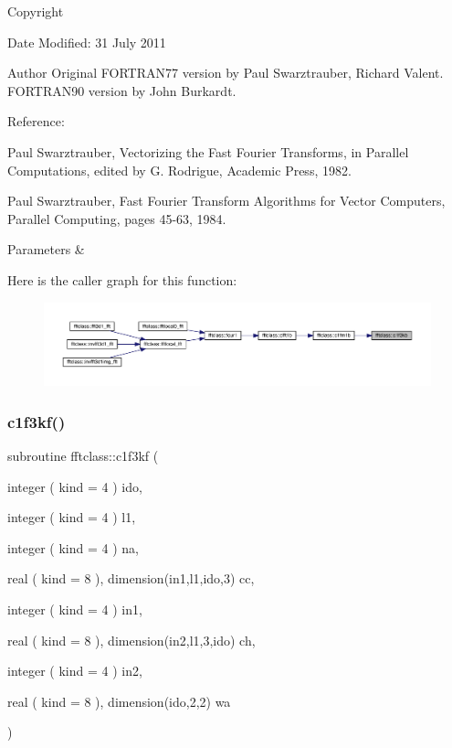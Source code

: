 \begin{DoxyCopyright}{Copyright}

\end{DoxyCopyright}
\begin{DoxyDate}{Date}
Modified\+: 31 July 2011 
\end{DoxyDate}
\begin{DoxyAuthor}{Author}
Original F\+O\+R\+T\+R\+A\+N77 version by Paul Swarztrauber, Richard Valent. ~\newline
 F\+O\+R\+T\+R\+A\+N90 version by John Burkardt.
\end{DoxyAuthor}
\begin{DoxyVerb}  Reference:

    Paul Swarztrauber,
    Vectorizing the Fast Fourier Transforms,
    in Parallel Computations,
    edited by G. Rodrigue,
    Academic Press, 1982.

    Paul Swarztrauber,
    Fast Fourier Transform Algorithms for Vector Computers,
    Parallel Computing, pages 45-63, 1984.\end{DoxyVerb}
 
\begin{DoxyParams}{Parameters}
{\em } & \\
\hline
\end{DoxyParams}
Here is the caller graph for this function\+:\nopagebreak
\begin{figure}[H]
\begin{center}
\leavevmode
\includegraphics[width=350pt]{namespacefftclass_af43eb54e0a7553e31585e67ad240b860_icgraph}
\end{center}
\end{figure}
\mbox{\label{namespacefftclass_ae586c2f39848274e0454c7d161522c31}} 
\subsubsection{\texorpdfstring{c1f3kf()}{c1f3kf()}}
{\footnotesize\ttfamily subroutine fftclass\+::c1f3kf (\begin{DoxyParamCaption}\item[{integer ( kind = 4 )}]{ido,  }\item[{integer ( kind = 4 )}]{l1,  }\item[{integer ( kind = 4 )}]{na,  }\item[{real ( kind = 8 ), dimension(in1,l1,ido,3)}]{cc,  }\item[{integer ( kind = 4 )}]{in1,  }\item[{real ( kind = 8 ), dimension(in2,l1,3,ido)}]{ch,  }\item[{integer ( kind = 4 )}]{in2,  }\item[{real ( kind = 8 ), dimension(ido,2,2)}]{wa }\end{DoxyParamCaption})}



